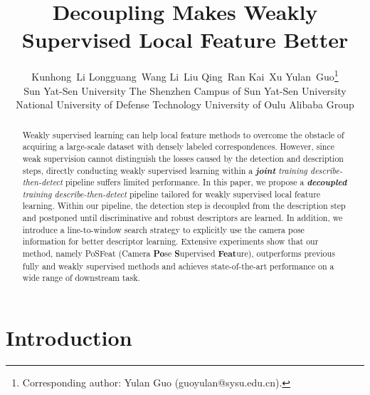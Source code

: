 \documentclass[10pt,twocolumn,letterpaper]{article}
\begin{document}
\title{Decoupling Makes Weakly Supervised Local Feature Better}

\author{Kunhong~Li\quad
        Longguang~Wang\quad
        Li~Liu\quad 
        Qing~Ran\quad
        Kai~Xu\quad
        Yulan~Guo\thanks{Corresponding author: Yulan Guo (guoyulan@sysu.edu.cn).}\\
        Sun Yat-Sen University
        \quad
        The Shenzhen Campus of Sun Yat-Sen University\\
        National University of Defense Technology
        \quad
        University of Oulu
        \quad
        Alibaba Group
}
\maketitle

\begin{abstract}
Weakly supervised learning can help local feature methods to overcome the obstacle of acquiring a large-scale dataset with densely labeled correspondences. However, since weak supervision cannot distinguish the losses caused by the detection and description steps, directly conducting weakly supervised learning within a \textit{\textbf{joint} training describe-then-detect} pipeline suffers limited performance. In this paper, we propose a \textit{\textbf{decoupled} training describe-then-detect} pipeline tailored for weakly supervised local feature learning. Within our pipeline, the detection step is decoupled from the description step and postponed until discriminative and robust descriptors are learned. In addition, we introduce a line-to-window search strategy to explicitly use the camera pose information for better descriptor learning. Extensive experiments show that our method, namely PoSFeat (Camera \textbf{Po}se \textbf{S}upervised \textbf{Feat}ure), outperforms previous fully and weakly supervised methods and achieves state-of-the-art performance on a wide range of downstream task. \let\thefootnote\relax{}
\end{abstract}

\section{Introduction}
\end{document}
